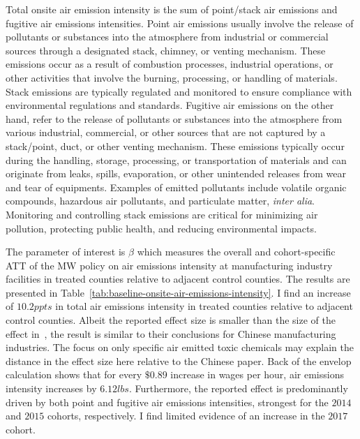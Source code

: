 \documentclass[authoryear, preprint, twocolumn, 1p]{elsarticle}
\begin{document}
    Total onsite air emission intensity is the sum of point/stack air emissions and fugitive air emissions intensities. Point air emissions usually involve the release of pollutants or substances into the atmosphere from industrial or commercial sources through a designated stack, chimney, or venting mechanism. These emissions occur as a result of combustion processes, industrial operations, or other activities that involve the burning, processing, or handling of materials. Stack emissions are typically regulated and monitored to ensure compliance with environmental regulations and standards. Fugitive air emissions on the other hand, refer to the release of pollutants or substances into the atmosphere from various industrial, commercial, or other sources that are not captured by a stack/point, duct, or other venting mechanism. These emissions typically occur during the handling, storage, processing, or transportation of materials and can originate from leaks, spills, evaporation, or other unintended releases from wear and tear of equipments. Examples of emitted pollutants include volatile organic compounds, hazardous air pollutants, and particulate matter, \textit{inter alia}. Monitoring and controlling stack emissions are critical for minimizing air pollution, protecting public health, and reducing environmental impacts.
    

    The parameter of interest is $\beta$ which measures the overall and cohort-specific ATT of the MW policy on air emissions intensity at manufacturing industry facilities in treated counties relative to adjacent control counties. The results are presented in Table~\ref{tab:baseline-onsite-air-emissions-intensity}. I find an increase of $10.2ppts$ in total air emissions intensity in treated counties relative to adjacent control counties. Albeit the reported effect size is smaller than the size of the effect in~\citet{zhang2023unintended}, the result is similar to their conclusions for Chinese manufacturing industries. The focus on only specific air emitted toxic chemicals may explain the distance in the effect size here relative to the Chinese paper. Back of the envelop calculation shows that for every $\$0.89$ increase in wages per hour, air emissions intensity increases by $6.12lbs$. Furthermore, the reported effect is predominantly driven by both point and fugitive air emissions intensities, strongest for the $2014$ and $2015$ cohorts, respectively. I find limited evidence of an increase in the $2017$ cohort.
\end{document}
